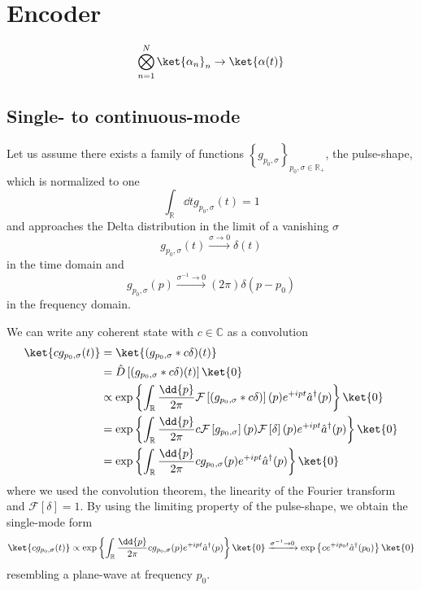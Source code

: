 \section{Encoder}

\begin{equation}
	\bigotimes_{n=1}^N
	\ket{\alpha_n}_n
	\to
	\ket{\alpha(t)}
\end{equation}

\subsection{Single- to continuous-mode}

Let us assume there exists a family of functions $\left\{g_{p_0,\sigma}\right\}_{p_0,\sigma\in\mathbb{R}_+}$, the pulse-shape, which is normalized to one
\begin{equation}
	\int_{\mathbb{R}}
	\dd{t}
	g_{p_0,\sigma}(t)
	=
	1	
\end{equation}
and approaches the Delta distribution in the limit of a vanishing $\sigma$
\begin{equation}
	g_{p_0,\sigma}(t)
	\xrightarrow{\sigma\to0}
	\delta(t)
\end{equation}
in the time domain and
\begin{equation}
	g_{p_0,\sigma}(p)
	\xrightarrow{\sigma^{-1}\to0}
	(2\pi)
	\delta(p-p_0)
\end{equation}
in the frequency domain.

We can write any coherent state with $c\in\mathbb{C}$ as a convolution
\begin{equation}
	\begin{split}
		\ket{cg_{p_0,\sigma}(t)}
		&=
		\ket{(g_{p_0,\sigma}*c\delta)(t)}
		\\
		&=
		\hat{D}\left[(g_{p_0,\sigma}*c\delta)(t)\right]
		\ket{0}
		\\
		&\propto
		\exp\left\{
			\int_\mathbb{R}
			\frac{\dd{p}}{2\pi}
			\mathcal{F}\left[(g_{p_0,\sigma}*c\delta)\right](p)
			e^{+ipt}
			\hat{a}^\dagger(p)
		\right\}
		\ket{0}
		\\
		&=
		\exp\left\{
			\int_\mathbb{R}
			\frac{\dd{p}}{2\pi}
			c
			\mathcal{F}\left[g_{p_0,\sigma}\right](p)
			\mathcal{F}\left[\delta\right](p)
			e^{+ipt}
			\hat{a}^\dagger(p)
		\right\}
		\ket{0}
		\\
		&=
		\exp\left\{
			\int_\mathbb{R}
			\frac{\dd{p}}{2\pi}
			cg_{p_0,\sigma}(p)
			e^{+ipt}
			\hat{a}^\dagger(p)
		\right\}
		\ket{0}
	\end{split}
\end{equation}
where we used the convolution theorem, the linearity of the Fourier transform and $\mathcal{F}[\delta]=1$.
By using the limiting property of the pulse-shape, we obtain the single-mode form
\begin{equation}
	\ket{cg_{p_0,\sigma}(t)}
	\propto
	\exp\left\{
		\int_\mathbb{R}
		\frac{\dd{p}}{2\pi}
		cg_{p_0,\sigma}(p)
		e^{+ipt}
		\hat{a}^\dagger(p)
	\right\}
	\ket{0}
	\xrightarrow{\sigma^{-1}\to0}
	\exp\left\{
		c
		e^{+ip_0t}
		\hat{a}^\dagger(p_0)
	\right\}
	\ket{0}
\end{equation}
resembling a plane-wave at frequency $p_0$.

